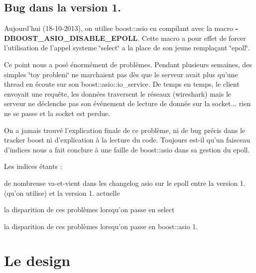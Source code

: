 \par
 \hypertarget{index_ssec_boost_bug}{}\subsection{Bug dans la version 1.}\label{index_ssec_boost_bug}
Aujourd'hui (18-\/10-\/2013), on utilise boost\-::asio en compilant avec la macro {\bfseries -\/\-D\-B\-O\-O\-S\-T\-\_\-\-A\-S\-I\-O\-\_\-\-D\-I\-S\-A\-B\-L\-E\-\_\-\-E\-P\-O\-L\-L}. Cette macro a pour effet de forcer l'utilisation de l'appel systeme \char`\"{}select\char`\"{} a la place de son jeune remplaçant \char`\"{}epoll\char`\"{}.

Ce point nous a posé énormément de problèmes. Pendant plusieurs semaines, des simples \char`\"{}toy problem\char`\"{} ne marchaient pas dès que le serveur avait plus qu'une thread en écoute sur son boost\-::asio\-::io\-\_\-service. De temps en temps, le client envoyait une requête, les données traversent le réseaux (wireshark) mais le serveur ne déclenche pas son événement de lecture de donnée sur la socket... rien ne se passe et la socket est perdue.

On a jamais trouvé l'explication finale de ce problème, ni de bug précis dans le tracker boost ni d'explication à la lecture du code. Toujours est-\/il qu'un faisceau d'indices nous a fait conclure à une faille de boost\-::asio dans sa gestion du epoll.

Les indices étants \-:
\begin{DoxyItemize}
\item de nombreuse va-\/et-\/vient dans les changelog asio sur le epoll entre la version 1. (qu'on utilise) et la version 1. actuelle
\item la disparition de ces problèmes lorsqu'on passe en select
\item la disparition de ces problèmes lorsqu'on passe en boost\-::asio 1.
\end{DoxyItemize}

\par


 \hypertarget{index_sec_design}{}\section{Le design}\label{index_sec_design}




